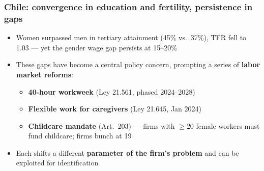 \documentclass[aspectratio=169, 11pt]{beamer}
\begin{document}

\begin{frame}
\frametitle{Chile: convergence in education and fertility, persistence in gaps}

\begin{itemize}
    \item Women surpassed men in tertiary attainment (45\% vs.\ 37\%), TFR fell to 1.03 --- yet the gender wage gap persists at 15--20\% %

    \medskip
    \item These gaps have become a central policy concern, prompting a series of \textbf{labor market reforms}:
    \begin{itemize}
        \smallskip
        \item \textbf{40-hour workweek} (Ley 21.561, phased 2024--2028) %
        \smallskip
        \item \textbf{Flexible work for caregivers} (Ley 21.645, Jan 2024) %
        \smallskip
        \item \textbf{Childcare mandate} (Art.\ 203) --- firms with $\geq$20 female workers must fund childcare; firms bunch at 19
    \end{itemize}

    \medskip
    \item Each shifts a different \textbf{parameter of the firm's problem} and can be exploited for identification
\end{itemize}

\end{frame}
\end{document}
